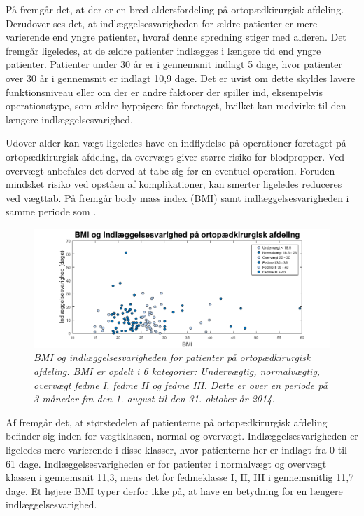 \noindent
På  fremgår det, at der er en bred aldersfordeling på ortopædkirurgisk afdeling. Derudover ses det, at indlæggelsesvarigheden for ældre patienter er mere varierende end yngre patienter, hvoraf denne spredning stiger med alderen. Det fremgår ligeledes, at de ældre patienter indlægges i længere tid end yngre patienter. Patienter under $30$ år er i gennemsnit indlagt 5 dage, hvor patienter over $30$ år i gennemsnit er indlagt 10,9 dage. Det er uvist om dette skyldes lavere funktionsniveau eller om der er andre faktorer der spiller ind, eksempelvis operationstype, som ældre hyppigere får foretaget, hvilket kan medvirke til den længere indlæggelsesvarighed.


Udover alder kan vægt ligeledes have en indflydelse på operationer foretaget på ortopædkirurgisk afdeling, da overvægt giver større risiko for blodpropper\cite{Ermonds2004}. Ved overvægt anbefales det derved at tabe sig før en eventuel operation. Foruden mindsket risiko ved opståen af komplikationer, kan smerter ligeledes reduceres ved vægttab.\cite{Nordjylland2014} På  fremgår body mass index (BMI) samt indlæggelsesvarigheden i samme periode som .

\begin{figure}[H]
	\centering
	\includegraphics[scale=0.6]{figures/BMIogindlaeg}
	\caption{\textit{BMI og indlæggelsesvarigheden for patienter på ortopædkirurgisk afdeling. BMI er opdelt i 6 kategorier: Undervægtig, normalvægtig, overvægt fedme I, fedme II og fedme III. Dette er over en periode på 3 måneder fra den 1. august til den 31. oktober år 2014.}}
	\label{BMIogindlaeggelse}
\end{figure}


\noindent
Af  fremgår det, at størstedelen af patienterne på ortopædkirurgisk afdeling befinder sig inden for vægtklassen, normal og overvægt. Indlæggelsesvarigheden er ligeledes mere varierende i disse klasser, hvor patienterne her er indlagt fra 0 til 61 dage. Indlæggelsesvarigheden er for patienter i normalvægt og overvægt klassen i gennemsnit 11,3, mens det for fedmeklasse I, II, III i gennemsnitlig 11,7 dage. Et højere BMI typer derfor ikke på, at have en betydning for en længere indlæggelsesvarighed. 


